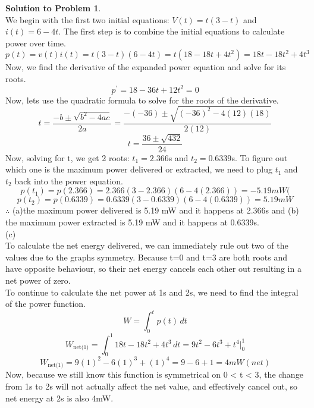 \documentclass[11pt,letterpaper]{article}
\theoremstyle{definition}
\newtheorem{solprob}{\textcolor{solproblemcolor}{Solution to Problem}}  %
\begin{document}
\begin{solprob} \text{}\\
    We begin with the first two initial equations: $V(t) = t(3-t)$ and $i(t) = 6-4t$.  The first step is to combine the initial equations to calculate power over time.
    \[p(t) = v(t)i(t) = t(3-t)(6-4t) = t(18-18t+4t^2) = 18t-18t^2+4t^3\]
    Now, we find the derivative of the expanded power equation and solve for its roots.
    \[p^\prime = 18-36t+12t^2 = 0\]
    Now, lets use the quadratic formula to solve for the roots of the derivative.
    \[t = \frac{-b\pm \sqrt{b^2 - 4ac}}{2a} = \frac{-(-36)\pm \sqrt{(-36)^2 - 4(12)(18)}}{2(12)}\]
    \[t = \frac{36 \pm \sqrt{432}}{24}\]
    Now, solving for t, we get 2 roots: $t_ 1 = 2.366$s and $t_2 = 0.6339$s. To figure out which one is the maximum power delivered or extracted, we need to plug $t_1$ and $t_2$ back into the power equation.
    \[p(t_1) = p(2.366) = 2.366(3-2.366)(6-4(2.366)) = -5.19mW\text{(}\]
    \[p(t_2) = p(0.6339) = 0.6339(3-0.6339)(6-4(0.6339)) = 5.19mW\]
    $\therefore$ (a)the maximum power delivered is 5.19 mW and it happens at 2.366s and (b) the maximum power extracted is 5.19 mW and it happens at 0.6339s.
    \\(c)\\
    To calculate the net energy delivered, we can immediately rule out two of the values due to the graphs symmetry. Because t=0 and t=3 are both roots and have opposite behaviour, so their net energy cancels each other out resulting in a net power of zero.\\
    To continue to calculate the net power at 1s and 2s, we need to find the integral of the power function.
    \[W = \int_0^tp(t)\,dt\]
    \[W_\text{net(1)} = \int_0^1 18t-18t^2+4t^3\,dt = 9t^2-6t^3 + t^4|_0^1\]
    \[W_\text{net(1)} = 9(1)^2 - 6(1)^3+(1)^4 = 9-6+1 = 4mW(net)\]
    Now, because we still know this function is symmetrical on 0 < t < 3, the change from 1s to 2s will not actually affect the net value, and effectively cancel out, so net energy at 2s is also 4mW.
    
\end{solprob}

\noindent\makebox[\linewidth]{\color{rouge_poly}{\rule{\textwidth}{1.3pt}}}	
\end{document}
